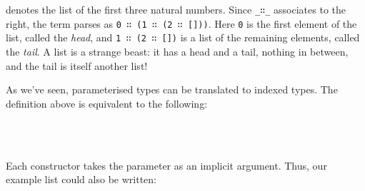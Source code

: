 denotes the list of the first three natural numbers. Since
\texttt{\_∷\_} associates to the right, the term parses as
\texttt{0\ ∷\ (1\ ∷\ (2\ ∷\ {[}{]}))}. Here \texttt{0} is the first
element of the list, called the \emph{head}, and
\texttt{1\ ∷\ (2\ ∷\ {[}{]})} is a list of the remaining elements,
called the \emph{tail}. A list is a strange beast: it has a head and a
tail, nothing in between, and the tail is itself another list!

As we've seen, parameterised types can be translated to indexed types.
The definition above is equivalent to the following:

\begin{fence}
\begin{code}%
\>[0]\AgdaSpace{}%
\AgdaSpace{}%
\AgdaSymbol{:}\AgdaSpace{}%
\AgdaSpace{}%
\AgdaSpace{}%
\AgdaSpace{}%
\<%
\\
\>[0][@{}l@{\AgdaIndent{0}}]%
\>[2]%
\>[7]\AgdaSymbol{:}\AgdaSpace{}%
\AgdaSpace{}%
\AgdaSymbol{\{}\AgdaSpace{}%
\AgdaSymbol{:}\AgdaSpace{}%
\AgdaSymbol{\}}\AgdaSpace{}%
\AgdaSpace{}%
\AgdaSpace{}%
\<%
\\
%
\>[2]\AgdaSpace{}%
\AgdaSymbol{:}\AgdaSpace{}%
\AgdaSpace{}%
\AgdaSymbol{\{}\AgdaSpace{}%
\AgdaSymbol{:}\AgdaSpace{}%
\AgdaSymbol{\}}\AgdaSpace{}%
\AgdaSpace{}%
\AgdaSpace{}%
\AgdaSpace{}%
\AgdaSpace{}%
\AgdaSpace{}%
\AgdaSpace{}%
\AgdaSpace{}%
\<%
\end{code}
\end{fence}

Each constructor takes the parameter as an implicit argument. Thus, our
example list could also be written:

\begin{fence}
\begin{code}%
\>[0]\AgdaFunction{\AgdaUnderscore{}}\AgdaSpace{}%
\AgdaSymbol{:}\AgdaSpace{}%
\AgdaSpace{}%
\<%
\\
\>[0]\AgdaSymbol{\AgdaUnderscore{}}\AgdaSpace{}%
\AgdaSymbol{=}\AgdaSpace{}%
\AgdaSpace{}%
\AgdaSymbol{\{}\AgdaSymbol{\}}\AgdaSpace{}%
\AgdaSpace{}%
\AgdaSymbol{(}\AgdaSpace{}%
\AgdaSymbol{\{}\AgdaSymbol{\}}\AgdaSpace{}%
\AgdaSpace{}%
\AgdaSymbol{(}\AgdaSpace{}%
\AgdaSymbol{\{}\AgdaSymbol{\}}\AgdaSpace{}%
\AgdaSpace{}%
\AgdaSymbol{(}\AgdaInductiveConstructor{[]}\AgdaSpace{}%
\AgdaSymbol{\{}\AgdaSymbol{\})))}\<%
\end{code}
\end{fence}

